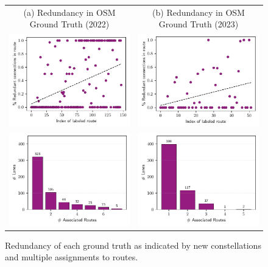 \begin{figure}[t]
\centering 
\begin{tabular}{cc}
\footnotesize{(a) Redundancy in OSM Ground Truth (2022)} & \footnotesize{(b) Redundancy in OSM Ground Truth (2023)} \\
\includegraphics[width=0.45\linewidth]{images/matching-ground-truth-progression-osm-old.pdf} & \includegraphics[width=0.45\linewidth]{images/matching-ground-truth-progression-osm.pdf} \\
\includegraphics[width=0.45\linewidth]{images/matching-ground-truth-lsas-per-route-osm-old.pdf} & \includegraphics[width=0.45\linewidth]{images/matching-ground-truth-lsas-per-route-osm.pdf} \\
\end{tabular}
\caption{Redundancy of each ground truth as indicated by new constellations and multiple assignments to routes.}
\label{fig:ground-truth-routes-per-lanes-osm}
\end{figure}

